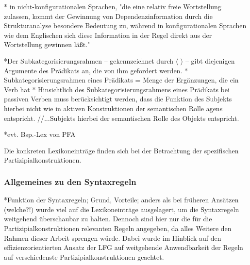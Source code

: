 \documentclass[12pt,a4paper]{article}
\begin{document}
* in nicht-konfigurationalen Sprachen, "die eine
relativ freie Wortstellung zulassen, kommt der Gewinnung von
Dependenzinformation durch die Strukturanalyse besondere
Bedeutung zu, während in konfigurationalen Sprachen wie dem Englischen sich
diese Information in der Regel direkt aus der Wortstellung gewinnen läßt."

*Der Subkategorisierungsrahmen -- gekennzeichnet durch $\langle$ $\rangle$ -- gibt diejenigen Argumente des Prädikats an, die von ihm gefordert werden.
* Subkategorisierungsrahmen eines Prädikats = Menge der Ergänzungen, die ein Verb hat
* Hinsichtlich des Subkategorisierungsrahmens eines Prädikats bei passiven Verben muss berücksichtigt werden, dass die Funktion des Subjekts hierbei nicht wie in aktiven Konstruktionen der semantischen Rolle agens entspricht. //...Subjekts hierbei der semantischen Rolle des Objekts entspricht.

*evt. Bsp.-Lex von PFA

Die konkreten Lexikoneinträge finden sich bei der Betrachtung der spezifischen Partizipialkonstruktionen.












\subsubsection{Allgemeines zu den Syntaxregeln}
*Funktion der Syntaxregeln; Grund, Vorteile; anders als bei früheren Ansätzen (welche?!) wurde viel auf die Lexikoneinträge ausgelagert, um die Syntaxregeln weitgehend überschaubar zu halten. Dennoch sind hier nur die für die Partizipialkonstruktionen relevanten Regeln angegeben, da alles Weitere den Rahmen dieser Arbeit sprengen würde. Dabei wurde im Hinblick auf den effizienzorientierten Ansatz der LFG auf weitgehende Anwendbarkeit der Regeln auf verschiedenste Partizipialkonstruktionen geachtet. \\
\end{document}
